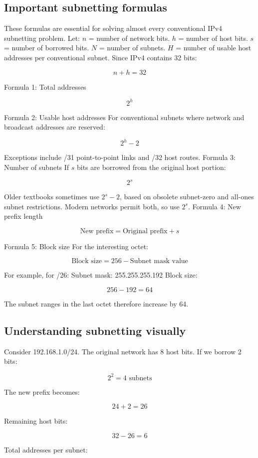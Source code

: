 \subsection{Important subnetting formulas}
These formulas are essential for solving almost every conventional IPv4 subnetting problem.
Let:
$n$ = number of network bits.
$h$ = number of host bits.
$s$ = number of borrowed bits.
$N$ = number of subnets.
$H$ = number of usable host addresses per conventional subnet.
Since IPv4 contains 32 bits:

\[
n+h=32
\]

Formula 1: Total addresses

\[
\boxed{2^h}
\]

Formula 2: Usable host addresses
For conventional subnets where network and broadcast addresses are reserved:

\[
\boxed{2^h-2}
\]

Exceptions include /31 point-to-point links and /32 host routes.
Formula 3: Number of subnets
If $s$ bits are borrowed from the original host portion:

\[
\boxed{2^s}
\]

Older textbooks sometimes use $2^s-2$, based on obsolete subnet-zero and all-ones subnet restrictions. Modern networks permit both, so use $2^s$.
Formula 4: New prefix length

\[
\boxed{\text{New prefix}=\text{Original prefix}+s}
\]

Formula 5: Block size
For the interesting octet:

\[
\boxed{\text{Block size}=256-\text{Subnet mask value}}
\]

For example, for /26:
Subnet mask:
255.255.255.192
Block size:

\[
256-192=64
\]

The subnet ranges in the last octet therefore increase by 64.
\subsection{Understanding subnetting visually}
Consider 192.168.1.0/24.
The original network has 8 host bits.
If we borrow 2 bits:

\[
2^2=4\text{ subnets}
\]

The new prefix becomes:

\[
24+2=26
\]

Remaining host bits:

\[
32-26=6
\]

Total addresses per subnet:

